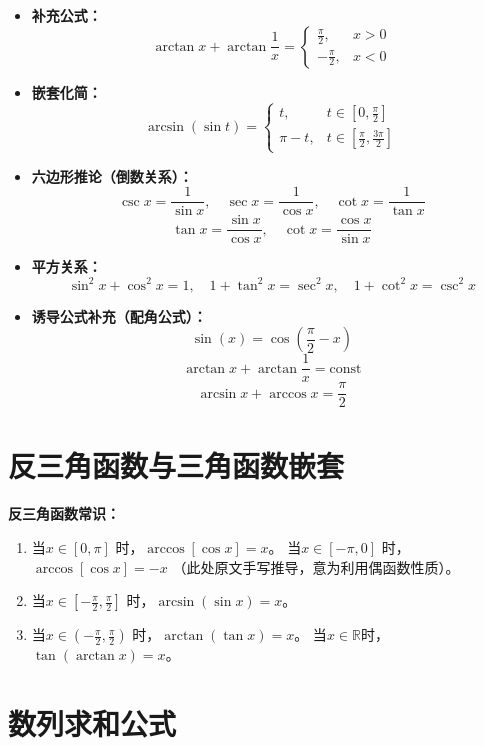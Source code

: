 \documentclass[a4paper,12pt]{ctexart}
\begin{document}
\begin{itemize}
    \item \textbf{补充公式：}
    \[ \arctan x + \arctan \frac{1}{x} = \begin{cases} \frac{\pi}{2}, & x > 0 \\ -\frac{\pi}{2}, & x < 0 \end{cases} \]
    
    \item \textbf{嵌套化简：}
    \[ \arcsin(\sin t) = \begin{cases} t, & t \in [0, \frac{\pi}{2}] \\ \pi - t, & t \in [\frac{\pi}{2}, \frac{3\pi}{2}] \end{cases} \]
    
    \item \textbf{六边形推论（倒数关系）：}
    \[ \csc x = \frac{1}{\sin x}, \quad \sec x = \frac{1}{\cos x}, \quad \cot x = \frac{1}{\tan x} \]
    \[ \tan x = \frac{\sin x}{\cos x}, \quad \cot x = \frac{\cos x}{\sin x} \]
    
    \item \textbf{平方关系：}
    \[ \sin^2 x + \cos^2 x = 1, \quad 1 + \tan^2 x = \sec^2 x, \quad 1 + \cot^2 x = \csc^2 x \]
    
    \item \textbf{诱导公式补充（配角公式）：}
    \[ \sin(x) = \cos(\frac{\pi}{2} - x) \]
    \[ \arctan x + \arctan \frac{1}{x} = \text{const} \]
    \[ \arcsin x + \arccos x = \frac{\pi}{2} \]
\end{itemize}

\section*{反三角函数与三角函数嵌套}

\noindent \textbf{反三角函数常识：}
\begin{enumerate}
    \item 当$x \in [0, \pi]$ 时，$\arccos[\cos x] = x$。
          当$x \in [-\pi, 0]$ 时，$\arccos[\cos x] = -x$ （此处原文手写推导，意为利用偶函数性质）。
    \item 当$x \in [-\frac{\pi}{2}, \frac{\pi}{2}]$ 时，$\arcsin(\sin x) = x$。
    \item 当$x \in (-\frac{\pi}{2}, \frac{\pi}{2})$ 时，$\arctan(\tan x) = x$。
          当$x \in \mathbb{R}$时，$\tan(\arctan x) = x$。
\end{enumerate}

\section*{数列求和公式}
\end{document}
